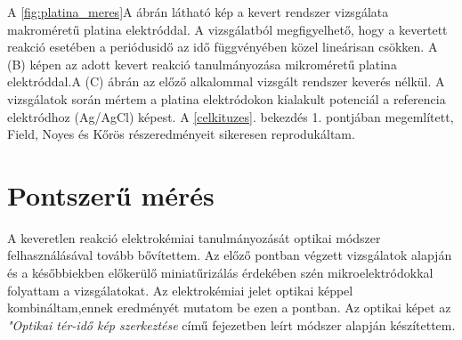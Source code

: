 A \ref{fig:platina_meres}A ábrán látható kép a kevert rendszer vizsgálata makroméretű platina elektróddal. A vizsgálatból megfigyelhető, hogy a kevertett reakció esetében a periódusidő az idő függvényében közel lineárisan csökken. A (B) képen az adott kevert reakció tanulmányozása mikroméretű platina elektróddal.A (C) ábrán az előző alkalommal vizsgált rendszer keverés nélkül. A vizsgálatok során mértem a platina elektródokon kialakult potenciál a referencia elektródhoz (Ag/AgCl) képest. A \ref{celkituzes}. bekezdés 1. pontjában megemlített, Field, Noyes és Kőrös részeredményeit \cite{noyes1972oscillations} sikeresen reprodukáltam.  







\section{Pontszerű mérés}
A keveretlen reakció elektrokémiai tanulmányozását optikai módszer felhasználásával tovább bővítettem. Az előző pontban végzett vizsgálatok alapján és a későbbiekben előkerülő miniatűrizálás érdekében szén mikroelektródokkal folyattam a vizsgálatokat. Az elektrokémiai jelet optikai képpel kombináltam,ennek eredményét  mutatom be ezen a pontban. Az optikai képet az \emph{"Optikai tér-idő kép szerkeztése} című fejezetben leírt módszer alapján készítettem.

